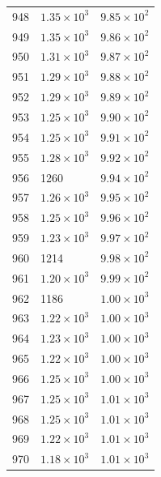 \begin{table}[H]
\begin{tabular}{lll}
948 & $\displaystyle 1.35 \times 10^{3}$ & $\displaystyle 9.85 \times 10^{2}$ \\
949 & $\displaystyle 1.35 \times 10^{3}$ & $\displaystyle 9.86 \times 10^{2}$ \\
950 & $\displaystyle 1.31 \times 10^{3}$ & $\displaystyle 9.87 \times 10^{2}$ \\
951 & $\displaystyle 1.29 \times 10^{3}$ & $\displaystyle 9.88 \times 10^{2}$ \\
952 & $\displaystyle 1.29 \times 10^{3}$ & $\displaystyle 9.89 \times 10^{2}$ \\
953 & $\displaystyle 1.25 \times 10^{3}$ & $\displaystyle 9.90 \times 10^{2}$ \\
954 & $\displaystyle 1.25 \times 10^{3}$ & $\displaystyle 9.91 \times 10^{2}$ \\
955 & $\displaystyle 1.28 \times 10^{3}$ & $\displaystyle 9.92 \times 10^{2}$ \\
956 & 1260 & $\displaystyle 9.94 \times 10^{2}$ \\
957 & $\displaystyle 1.26 \times 10^{3}$ & $\displaystyle 9.95 \times 10^{2}$ \\
958 & $\displaystyle 1.25 \times 10^{3}$ & $\displaystyle 9.96 \times 10^{2}$ \\
959 & $\displaystyle 1.23 \times 10^{3}$ & $\displaystyle 9.97 \times 10^{2}$ \\
960 & 1214 & $\displaystyle 9.98 \times 10^{2}$ \\
961 & $\displaystyle 1.20 \times 10^{3}$ & $\displaystyle 9.99 \times 10^{2}$ \\
962 & 1186 & $\displaystyle 1.00 \times 10^{3}$ \\
963 & $\displaystyle 1.22 \times 10^{3}$ & $\displaystyle 1.00 \times 10^{3}$ \\
964 & $\displaystyle 1.23 \times 10^{3}$ & $\displaystyle 1.00 \times 10^{3}$ \\
965 & $\displaystyle 1.22 \times 10^{3}$ & $\displaystyle 1.00 \times 10^{3}$ \\
966 & $\displaystyle 1.25 \times 10^{3}$ & $\displaystyle 1.00 \times 10^{3}$ \\
967 & $\displaystyle 1.25 \times 10^{3}$ & $\displaystyle 1.01 \times 10^{3}$ \\
968 & $\displaystyle 1.25 \times 10^{3}$ & $\displaystyle 1.01 \times 10^{3}$ \\
969 & $\displaystyle 1.22 \times 10^{3}$ & $\displaystyle 1.01 \times 10^{3}$ \\
970 & $\displaystyle 1.18 \times 10^{3}$ & $\displaystyle 1.01 \times 10^{3}$ \\

\end{tabular}
\end{table}
